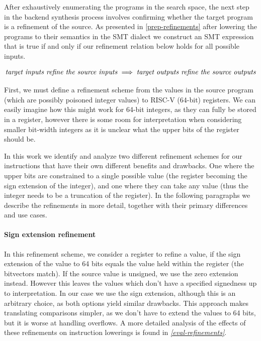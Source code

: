 After exhaustively enumerating the programs in the search space, the next step in the backend synthesis
process involves confirming whether the target program is a refinement of the source. 
As presented in \ref{prep-refinements} after lowering the programs to their semantics in the SMT dialect 
we construct an SMT expression that is true if and only if our refinement relation below holds for 
all possible inputs.

\begin{equation*}
\text{\emph{target inputs refine the source inputs}} \implies \text{\emph{target outputs refine the source outputs}}
\end{equation*}

First, we must define a refinement scheme from the values in the source program (which are possibly poisoned
integer values) to RISC-V (64-bit) registers. We can easily imagine how this might work for 64-bit integers, as they
can fully be stored in a register, however there is some room for interpretation when considering smaller
bit-width integers as it is unclear what the upper bits of the register should be.

In this work we identify and analyze two different refinement schemes for our instructions that have 
their own different benefits and drawbacks. One where the upper bits are constrained to a single
possible value (the register becoming the sign extension of the integer), and one where they can
take any value (thus the integer needs to be a truncation of the register). In the following paragraphs
we describe the refinements in more detail, together with their primary differences and use cases.

\paragraph{Sign extension refinement}

In this refinement scheme, we consider a register to refine a value, if the sign extension 
of the value to 64 bits equals the value held within the register (the bitvectors match).
If the source value is unsigned, we use the zero extension instead. However this leaves the
values which don't have a specified signedness up to interpretation. In our case we use the
sign extension, although this is an arbitrary choice, as both options yield similar drawbacks.
This approach makes translating comparisons simpler, as we don't have to extend the values
to 64 bits, but it is worse at handling overflows. A more detailed analysis of the effects 
of these refinements on instruction lowerings is found in \emph{\ref{eval-refinements}}.

